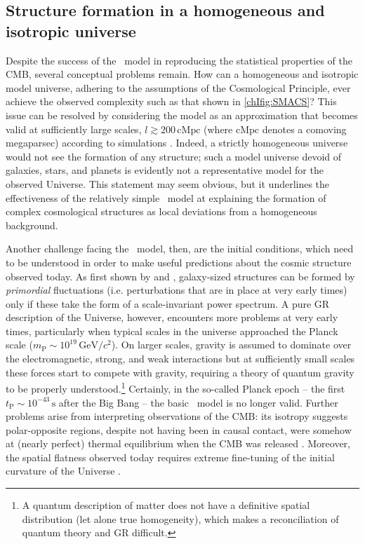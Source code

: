 \subsection{Structure formation in a homogeneous and isotropic universe}
\label{chIssec:Structure_formation_in_a_homogeneous_and_isotropic_universe}

Despite the success of the \LCDM\ model in reproducing the statistical properties of the CMB, several conceptual problems remain. How can a homogeneous and isotropic model universe, adhering to the assumptions of the Cosmological Principle, ever achieve the observed complexity such as that shown in \cref{chIfig:SMACS}? This issue can be resolved by considering the model as an approximation that becomes valid at sufficiently large scales, $l \gtrsim 200 \, \mathrm{cMpc}$ (where $\mathrm{cMpc}$ denotes a comoving megaparsec) according to simulations \citep[e.g.][]{2010MNRAS.405.2009Y}. Indeed, a strictly homogeneous universe would not see the formation of any structure; such a model universe devoid of galaxies, stars, and planets is evidently not a representative model for the observed Universe. This statement may seem obvious, but it underlines the effectiveness of the relatively simple \LCDM\ model at explaining the formation of complex cosmological structures as local deviations from a homogeneous background.

Another challenge facing the \LCDM\ model, then, are the initial conditions, which need to be understood in order to make useful predictions about the cosmic structure observed today. As first shown by \citet{1970PhRvD...1.2726H} and \citet{1972MNRAS.160P...1Z}, galaxy-sized structures can be formed by \textit{primordial} fluctuations (i.e. perturbations that are in place at very early times) only if these take the form of a scale-invariant power spectrum. A pure GR description of the Universe, however, encounters more problems at very early times, particularly when typical scales in the universe approached the Planck scale ($m_\text{P} \sim 10^{19} \, \mathrm{GeV}/c^2$). On larger scales, gravity is assumed to dominate over the electromagnetic, strong, and weak interactions but at sufficiently small scales these forces start to compete with gravity, requiring a theory of quantum gravity to be properly understood.\footnote{A quantum description of matter does not have a definitive spatial distribution (let alone true homogeneity), which makes a reconciliation of quantum theory and GR difficult.} Certainly, in the so-called Planck epoch -- the first $t_\text{P} \sim 10^{-43} \, \mathrm{s}$ after the Big Bang -- the basic \LCDM\ model is no longer valid. Further problems arise from interpreting observations of the CMB: its isotropy suggests polar-opposite regions, despite not having been in causal contact, were somehow at (nearly perfect) thermal equilibrium when the CMB was released \citep[the ``horizon problem'';][]{1968ApJ...151..431M}. Moreover, the spatial flatness observed today requires extreme fine-tuning of the initial curvature of the Universe \citep[the ``flatness problem'';][]{1979grec.conf..504D}.

